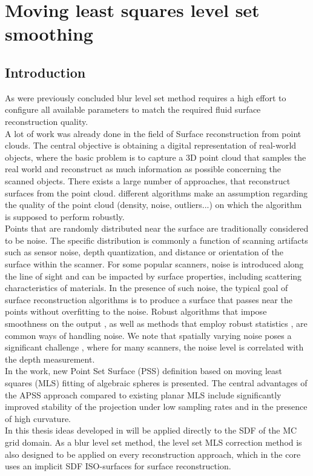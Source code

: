 \chapter{Moving least squares level set smoothing}
\section{Introduction}
As were previously concluded blur level set method requires a high effort to configure all available parameters to match the required fluid surface reconstruction quality.\\
A lot of work was already done in the field of Surface reconstruction from point clouds. 
The central objective is obtaining a digital representation of real-world objects, where the basic problem is to capture a 3D point cloud that samples the real world and reconstruct as much information as possible concerning the scanned objects. There exists a large number of approaches, that reconstruct surfaces from the point cloud. different algorithms make an assumption regarding the quality of the point cloud (density, noise, outliers...) on which the algorithm is supposed to perform robustly.\\
Points that are randomly distributed near the surface are traditionally considered to be noise. The specific distribution is commonly a function of scanning artifacts such as sensor noise, depth quantization, and distance or orientation of the surface within the scanner. For some popular scanners, noise is introduced along the line of sight and can be impacted by surface properties, including scattering characteristics of materials. In the presence of such noise, the typical goal of surface reconstruction algorithms is to produce a surface that passes near the points without overfitting to the noise. Robust algorithms that impose smoothness on the output \cite{PSR}, as well as methods that employ robust statistics \cite{FPPSKR}, are common ways of handling noise. We note that spatially varying noise poses a significant challenge \cite{NSRFRPS}, where for many scanners, the noise level is correlated with the depth measurement.\\
In the work, \cite{Apss} new Point Set Surface (PSS) definition based on moving least squares (MLS) fitting of algebraic spheres is presented. The central advantages of the APSS approach compared to existing planar MLS include significantly improved stability of the projection under low sampling rates and in the presence of high curvature.\\
In this thesis ideas developed in \cite{Apss} will be applied directly to the SDF of the MC grid domain. As a blur level set method, the level set MLS correction method is also designed to be applied on every reconstruction approach, which in the core uses an implicit SDF ISO-surfaces for surface reconstruction.  
